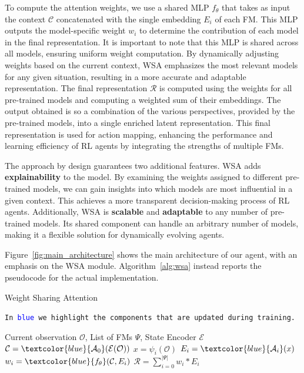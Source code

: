 To compute the attention weights, we use a shared MLP $f_\theta$ that takes as input the context $\mathcal{C}$ concatenated with the single embedding $E_i$ of each FM\@.
This MLP outputs the model-specific weight $w_i$ to determine the contribution of each model in the final representation.
It is important to note that this MLP is shared across all models, ensuring uniform weight computation.
By dynamically adjusting weights based on the current context, WSA emphasizes the most relevant models for any given situation, resulting in a more accurate and adaptable representation.
The final representation $\mathcal{R}$ is computed using the weights for all pre-trained models and computing a weighted sum of their embeddings.
The output obtained is so a combination of the various perspectives, provided by the pre-trained models, into a single enriched latent representation.
This final representation is used for action mapping, enhancing the performance and learning efficiency of RL agents by integrating the strengths of multiple FMs.


The approach by design guarantees two additional features.
WSA adds \textbf{explainability} to the model.
By examining the weights assigned to different pre-trained models, we can gain insights into which models are most influential in a given context.
This achieves a more transparent decision-making process of RL agents.
Additionally, WSA is \textbf{scalable} and \textbf{adaptable} to any number of pre-trained models.
Its shared component can handle an arbitrary number of models, making it a flexible solution for dynamically evolving agents.


Figure~\ref{fig:main_architecture} shows the main architecture of our agent, with an emphasis on the WSA module.
Algorithm~\ref{alg:wsa} instead reports the pseudocode for the actual implementation.

\begin{algorithm}[ht]
    \caption{Weight Sharing Attention}\label{alg:wsa}
    \texttt{In \textcolor{blue}{blue} we highlight the components that are updated during training.}\\
    \begin{algorithmic}[1]
        \Require Current observation $\mathcal{O}$, List of FMs $\Psi$, State Encoder $\mathcal{E}$
        \State $\mathcal{C} = \textcolor{blue}{\mathcal{A}_0}(\mathcal{E}(\mathcal{O}))$ 
            \State $x = \psi_i(\mathcal{O})$ 
            \State $E_i = \textcolor{blue}{\mathcal{A}_i}(x)$ 
            \State $w_i = \textcolor{blue}{f_\theta}(\mathcal{C}, E_i)$ 
        \EndFor
        \State $\mathcal{R} = \sum_{i=0}^{|\Psi|} w_i * E_i$ 
    \end{algorithmic}
\end{algorithm}



